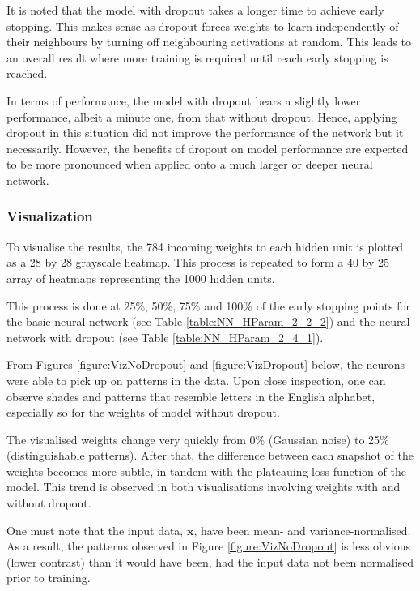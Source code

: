 \documentclass[a4paper,12pt]{article}
\begin{document}
It is noted that the model with dropout takes a longer time to achieve early stopping. This makes sense as dropout forces weights to learn independently of their neighbours by turning off neighbouring activations at random. This leads to an overall result where more training is required until reach early stopping is reached. 

In terms of performance, the model with dropout bears a slightly lower performance, albeit a minute one, from that without dropout. Hence, applying dropout in this situation did not improve the performance of the network but it necessarily. However, the benefits of dropout on model performance are expected to be more pronounced when applied onto a much larger or deeper neural network.

\clearpage
\subsubsection{Visualization}
To visualise the results, the 784 incoming weights to each hidden unit is plotted as a 28 by 28 grayscale heatmap. This process is repeated to form a 40 by 25 array of heatmaps representing the 1000 hidden units. 

This process is done at 25\%, 50\%, 75\% and 100\% of the early stopping points for the basic neural network (see Table \ref{table:NN_HParam_2_2_2}) and the neural network with dropout (see Table \ref{table:NN_HParam_2_4_1}).

From Figures \ref{figure:VizNoDropout} and \ref{figure:VizDropout} below, the neurons were able to pick up on patterns in the data. Upon close inspection, one can observe shades and patterns that resemble letters in the English alphabet, especially so for the weights of model without dropout. 

The visualised weights change very quickly from 0\% (Gaussian noise) to 25\% (distinguishable patterns). After that, the difference between each snapshot of the weights becomes more subtle, in tandem with the plateauing loss function of the model. This trend is observed in both visualisations involving weights with and without dropout.

One must note that the input data, $\mathbf{x}$, have been mean- and variance-normalised. As a result, the patterns observed in Figure \ref{figure:VizNoDropout} is less obvious (lower contrast) than it would have been, had the input data not been normalised prior to training.
\end{document}
